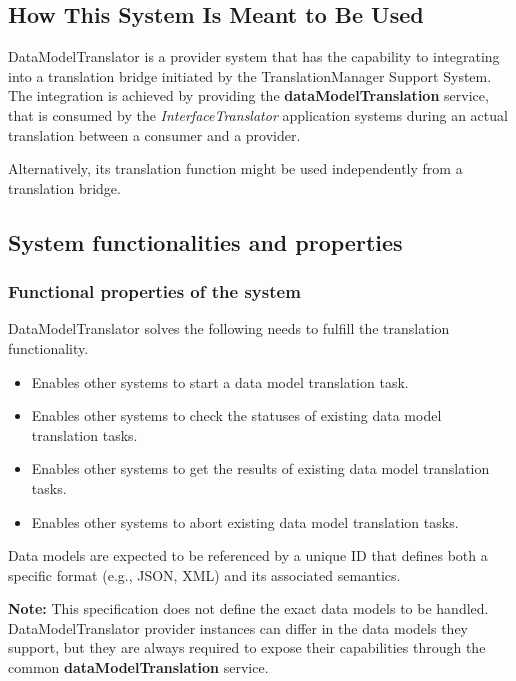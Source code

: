 \documentclass[a4paper]{arrowhead}
\begin{document}
\subsection{How This System Is Meant to Be Used}
\label{sec:use}

DataModelTranslator is a provider system that has the capability to integrating into a translation bridge initiated by the TranslationManager Support System. The integration is achieved by providing the \textbf{dataModelTranslation} service, that is consumed by the \textit{InterfaceTranslator} application systems during an actual translation between a consumer and a provider. 

Alternatively, its translation function might be used independently from a translation bridge. 

\subsection{System functionalities and properties}
\label{sec:properties}

\subsubsection {Functional properties of the system}
DataModelTranslator solves the following needs to fulfill the translation functionality.

\begin{itemize}
    \item Enables other systems to start a data model translation task.
    \item Enables other systems to check the statuses of existing data model translation tasks.
    \item Enables other systems to get the results of existing data model translation tasks.
    \item Enables other systems to abort existing data model translation tasks.
\end{itemize}

Data models are expected to be referenced by a unique ID that defines both a specific format (e.g., JSON, XML) and its associated semantics.

\textbf{Note:} This specification does not define the exact data models to be handled. DataModelTranslator provider instances can differ in the data models they support, but they are always required to expose their capabilities through the common \textbf{dataModelTranslation} service.
\end{document}
